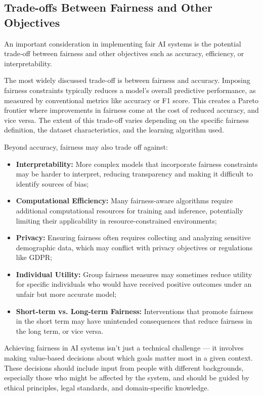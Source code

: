 \documentclass[12pt,a4paper,openright,twoside]{book}
\begin{document}
\subsection{Trade-offs Between Fairness and Other Objectives}
An important consideration in implementing fair AI systems is the potential trade-off between fairness and other objectives such as accuracy, efficiency, or interpretability.

The most widely discussed trade-off is between fairness and accuracy. Imposing fairness constraints typically reduces a model's overall predictive performance, as measured by conventional metrics like accuracy or F1 score. This creates a Pareto frontier where improvements in fairness come at the cost of reduced accuracy, and vice versa. The extent of this trade-off varies depending on the specific fairness definition, the dataset characteristics, and the learning algorithm used.

Beyond accuracy, fairness may also trade off against:

\begin{itemize}
    \item \textbf{Interpretability:} More complex models that incorporate fairness constraints may be harder to interpret, reducing transparency and making it difficult to identify sources of bias;
    
    \item \textbf{Computational Efficiency:} Many fairness-aware algorithms require additional computational resources for training and inference, potentially limiting their applicability in resource-constrained environments;
    
    \item \textbf{Privacy:} Ensuring fairness often requires collecting and analyzing sensitive demographic data, which may conflict with privacy objectives or regulations like GDPR;
    
    \item \textbf{Individual Utility:} Group fairness measures may sometimes reduce utility for specific individuals who would have received positive outcomes under an unfair but more accurate model;
    
    \item \textbf{Short-term vs. Long-term Fairness:} Interventions that promote fairness in the short term may have unintended consequences that reduce fairness in the long term, or vice versa.
\end{itemize}

Achieving fairness in AI systems isn’t just a technical challenge — it involves making value-based decisions about which goals matter most in a given context. These decisions should include input from people with different backgrounds, especially those who might be affected by the system, and should be guided by ethical principles, legal standards, and domain-specific knowledge.
\end{document}
